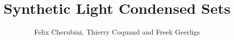 \documentclass{../util/zariski-small}
\title{Synthetic Light Condensed Sets}
\theoremstyle{break}
\begin{document}
\author{Felix Cherubini, Thierry Coquand and Freek Geerligs}

\maketitle





%
%
%
%

\printbibliography
\end{document}
